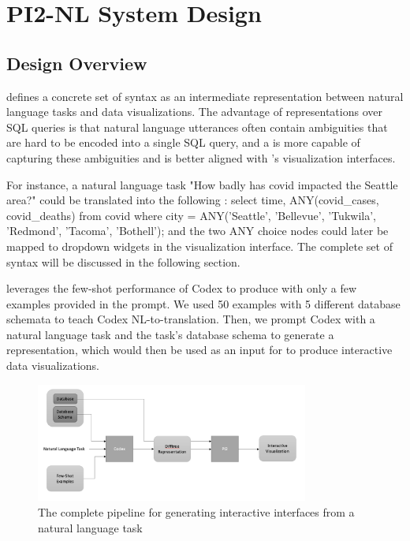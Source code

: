 \section{PI2-NL System Design}
\subsection{Design Overview}

\sys defines a concrete set of \difftree syntax as an intermediate representation between natural language tasks and data visualizations. The advantage of \difftree representations over SQL queries is that natural language utterances often contain ambiguities that are hard to be encoded into a single SQL query, and a \difftree is more capable of capturing these ambiguities and is better aligned with \sysold 's visualization interfaces.

For instance, a natural language task "How badly has covid impacted the Seattle area?" could be translated into the following \difftree : select time, ANY(covid\_cases, covid\_deaths) from covid where city = ANY('Seattle', 'Bellevue', 'Tukwila', 'Redmond', 'Tacoma', 'Bothell'); and the two ANY choice nodes could later be mapped to dropdown widgets in the visualization interface. The complete set of \difftree syntax will be discussed in the following section.

\sys leverages the few-shot performance of Codex to produce \difftrees with only a few examples provided in the prompt. We used 50 examples with 5 different database schemata to teach Codex NL-to-\difftree translation. Then, we prompt Codex with a natural language task and the task's database schema to generate a \difftree representation, which would then be used as an input for \sysold to produce interactive data visualizations.

\begin{figure}
    \centering
    \includegraphics[width=0.8\textwidth]{nlviz-workshop/figure/pipline.png}
    \caption{The complete pipeline for generating interactive interfaces from a natural language task}
    \label{fig:pipline}
\end{figure}


